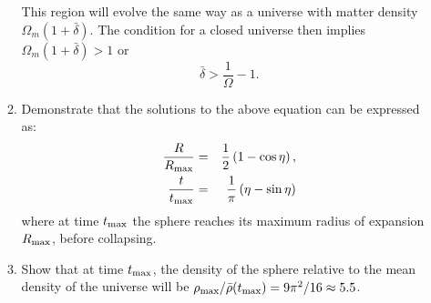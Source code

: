 \begin{enumerate}
\begin{enumerate}
\begin{answer}
This region will evolve the same way as a universe with
matter density $\Omega_m(1+\bar\delta)$. The condition for a closed
universe then implies $\Omega_m(1+\bar\delta)>1$ or
\begin{equation}
\bar\delta > \frac{1}{\Omega} -1.
\end{equation}
\end{answer}

\item Demonstrate that the solutions to the above equation can be
expressed as:
\begin{eqnarray}
\label{eq:sphericalcollapse}
\frac{R}{R_{\rm max}} &=& \frac{1}{2}\left(1 - \cos\eta\right), \cr
\frac{t}{t_{\rm max}} &=& \frac{1}{\pi}\left(\eta - \sin\eta\right)
\end{eqnarray}
where at time $t_{\rm max}$ the sphere reaches its maximum radius of
expansion $R_{\rm max}$, before collapsing. 

\item Show that at time $t_{\rm max}$, the density of the sphere
relative to the mean density of the universe will be $\rho_{\rm max}
/ \bar\rho(t_{\rm max}) = 9 \pi^2 / 16 \approx 5.5$.


\end{enumerate}
\end{enumerate}
